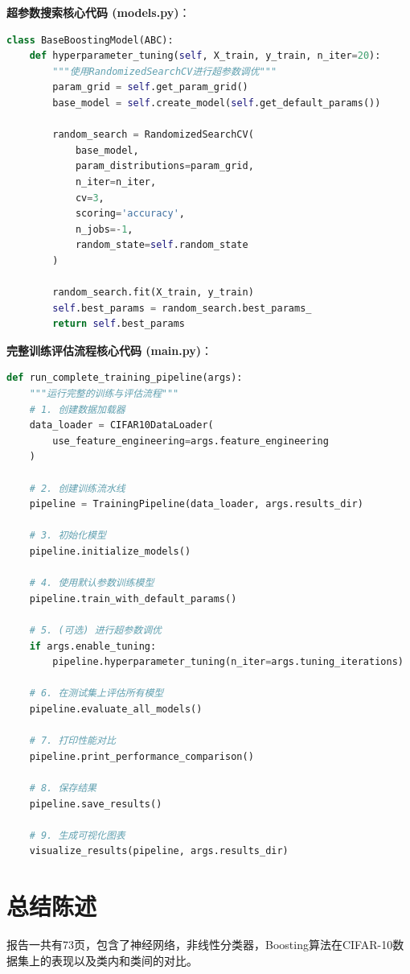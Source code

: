 \documentclass[UTF8]{report}
\theoremstyle{MyLineTheoremStyle} %
\theoremstyle{MyBlockTheoremStyle} %
\theoremstyle{MySubsubsectionStyle} %
\begin{document}
\textbf{超参数搜索核心代码 (models.py)}：
\begin{lstlisting}[language=Python, caption={基于随机搜索的超参数调优}]
class BaseBoostingModel(ABC):
    def hyperparameter_tuning(self, X_train, y_train, n_iter=20):
        """使用RandomizedSearchCV进行超参数调优"""
        param_grid = self.get_param_grid()
        base_model = self.create_model(self.get_default_params())
        
        random_search = RandomizedSearchCV(
            base_model,
            param_distributions=param_grid,
            n_iter=n_iter,
            cv=3,
            scoring='accuracy',
            n_jobs=-1,
            random_state=self.random_state
        )
        
        random_search.fit(X_train, y_train)
        self.best_params = random_search.best_params_
        return self.best_params
\end{lstlisting}

\textbf{完整训练评估流程核心代码 (main.py)}：
\begin{lstlisting}[language=Python, caption={项目主流程编排}]
def run_complete_training_pipeline(args):
    """运行完整的训练与评估流程"""
    # 1. 创建数据加载器
    data_loader = CIFAR10DataLoader(
        use_feature_engineering=args.feature_engineering
    )
    
    # 2. 创建训练流水线
    pipeline = TrainingPipeline(data_loader, args.results_dir)
    
    # 3. 初始化模型
    pipeline.initialize_models()
    
    # 4. 使用默认参数训练模型
    pipeline.train_with_default_params()
    
    # 5. (可选) 进行超参数调优
    if args.enable_tuning:
        pipeline.hyperparameter_tuning(n_iter=args.tuning_iterations)
    
    # 6. 在测试集上评估所有模型
    pipeline.evaluate_all_models()
    
    # 7. 打印性能对比
    pipeline.print_performance_comparison()
    
    # 8. 保存结果
    pipeline.save_results()
    
    # 9. 生成可视化图表
    visualize_results(pipeline, args.results_dir)
\end{lstlisting}
\chapter{总结陈述}

报告一共有73页，包含了神经网络，非线性分类器，Boosting算法在CIFAR-10数据集上的表现以及类内和类间的对比。
\end{document}
